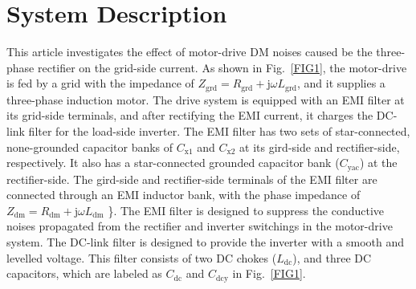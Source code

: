\documentclass[journal,a4paper,10pt,twoside]{IEEEtran} %
\begin{document}
	
	
	
	\section{System Description}
		This article investigates the effect of motor-drive DM noises caused be the three-phase rectifier on the grid-side current. As shown in Fig.~\ref{FIG1}, the motor-drive is fed by a grid with the impedance of $Z_\mathrm{grd}=R_{\mathrm{grd}}+\mathrm{j}{\omega}L_{\mathrm{grd}}$, and it supplies a three-phase induction motor. The drive system is equipped with an EMI filter at its grid-side terminals, and after rectifying the EMI current, it charges the DC-link filter for the load-side inverter. The EMI filter has two sets of star-connected, none-grounded capacitor banks of $C_\mathrm{x1}$ and $C_\mathrm{x2}$ at its gird-side and rectifier-side, respectively. It also has a star-connected grounded capacitor bank ($C_\mathrm{yac}$) at the rectifier-side. The gird-side and rectifier-side terminals of the EMI filter are connected through an EMI inductor bank, with the phase impedance of $Z_{\mathrm{dm}}=R_\mathrm{dm}+\mathrm{j}{\omega}L_\mathrm{dm}$ {\}}. The EMI filter is designed to suppress the conductive noises propagated from the rectifier and inverter switchings in the motor-drive system. The DC-link filter is designed to provide the inverter with a smooth and levelled voltage. This filter consists of two DC chokes ($L_\mathrm{dc}$), and three DC capacitors, which are labeled as $C_\mathrm{dc}$ and $C_\mathrm{dcy}$ in Fig.~\ref{FIG1}. 
		
\end{document}
